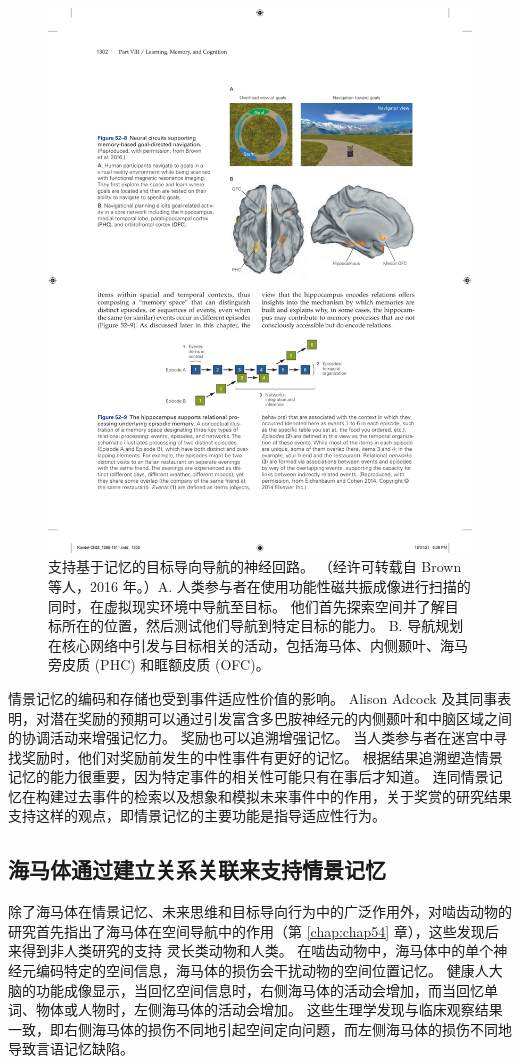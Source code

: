 \begin{figure}[htbp]
	\centering
	\includegraphics[width=0.7\linewidth]{chap52/fig_52_8}
	\caption{支持基于记忆的目标导向导航的神经回路。 （经许可转载自 Brown 等人，2016 年。）A. 人类参与者在使用功能性磁共振成像进行扫描的同时，在虚拟现实环境中导航至目标。 他们首先探索空间并了解目标所在的位置，然后测试他们导航到特定目标的能力。 B. 导航规划在核心网络中引发与目标相关的活动，包括海马体、内侧颞叶、海马旁皮质 (PHC) 和眶额皮质 (OFC)。}
	\label{fig:52_8}
\end{figure}

情景记忆的编码和存储也受到事件适应性价值的影响。 Alison Adcock 及其同事表明，对潜在奖励的预期可以通过引发富含多巴胺神经元的内侧颞叶和中脑区域之间的协调活动来增强记忆力。 奖励也可以追溯增强记忆。 当人类参与者在迷宫中寻找奖励时，他们对奖励前发生的中性事件有更好的记忆。 根据结果追溯塑造情景记忆的能力很重要，因为特定事件的相关性可能只有在事后才知道。 连同情景记忆在构建过去事件的检索以及想象和模拟未来事件中的作用，关于奖赏的研究结果支持这样的观点，即情景记忆的主要功能是指导适应性行为。

\subsection{海马体通过建立关系关联来支持情景记忆}
除了海马体在情景记忆、未来思维和目标导向行为中的广泛作用外，对啮齿动物的研究首先指出了海马体在空间导航中的作用（第 \ref{chap:chap54} 章），这些发现后来得到非人类研究的支持 灵长类动物和人类。 在啮齿动物中，海马体中的单个神经元编码特定的空间信息，海马体的损伤会干扰动物的空间位置记忆。 健康人大脑的功能成像显示，当回忆空间信息时，右侧海马体的活动会增加，而当回忆单词、物体或人物时，左侧海马体的活动会增加。 这些生理学发现与临床观察结果一致，即右侧海马体的损伤不同地引起空间定向问题，而左侧海马体的损伤不同地导致言语记忆缺陷。

